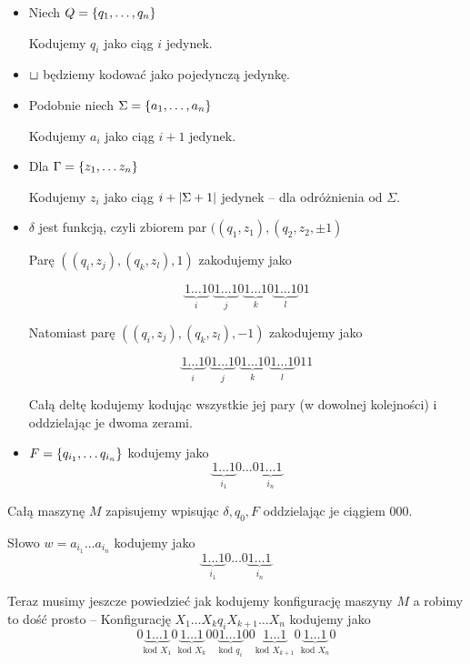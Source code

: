 \begin{itemize}
    \item Niech \( Q = \set{q_1, \dots, q_n} \)
    
    Kodujemy \( q_i \) jako ciąg \( i \) jedynek.
    
    \item \( \sqcup \) będziemy kodować jako pojedynczą jedynkę.
    
    
    \item Podobnie niech \( \Sigma = \set{a_1, \dots, a_n} \)
    
    Kodujemy \( a_i \) jako ciąg \( i + 1 \) jedynek.
    
    \item Dla \( \Gamma = \set{z_1, \dots z_n} \)
    
    Kodujemy \( z_i \) jako ciąg \( i + \card{\Sigma + 1} \) jedynek -- dla odróżnienia od \( \Sigma \).
    
    \item \( \delta \) jest funkcją, czyli zbiorem par \( ((q_1, z_1), (q_2, z_2, \pm 1) \)
    
    Parę \( ((q_i, z_j), (q_k, z_l), 1) \) zakodujemy jako
    
    \[
        \underbrace{1 \dots 1}_i
        0
        \underbrace{1 \dots 1}_j
        0
        \underbrace{1 \dots 1}_k
        0
        \underbrace{1 \dots 1}_l
        0
        1
    \]
    
    Natomiast parę \( ((q_i, z_j), (q_k, z_l), -1) \) zakodujemy jako
    
    \[
        \underbrace{1 \dots 1}_i
        0
        \underbrace{1 \dots 1}_j
        0
        \underbrace{1 \dots 1}_k
        0
        \underbrace{1 \dots 1}_l
        0
        11
    \]
    
    Całą deltę kodujemy kodując wszystkie jej pary (w dowolnej kolejności) i oddzielając je dwoma zerami.
    
    \item \( F = \set{q_{i_1}, \dots q_{i_n}} \) kodujemy jako
    \[
        \underbrace{1 \dots 1}_{i_1} 0 \dots 0 \underbrace{1 \dots 1}_{i_n}
    \]
\end{itemize}

Całą maszynę \( M \) zapisujemy wpisując \( \delta, q_0, F \) oddzielając je ciągiem \( 000 \).

Słowo \( w = a_{i_1} \dots a_{i_n} \) kodujemy jako
\[
    \underbrace{1 \dots 1}_{i_1} 0 \dots 0 \underbrace{1 \dots 1}_{i_n}
\]

Teraz musimy jeszcze powiedzieć jak kodujemy konfigurację maszyny \( M \) a robimy to dość prosto --
Konfigurację \( X_1 \dots X_k q_i X_{k+1} \dots X_n \) kodujemy jako
\[
    0\underbrace{1 \dots 1}_{\text{kod } X_1} 0 \underbrace{1 \dots 1}_{\text{kod } X_k} 00 \underbrace{1 \dots 1}_{\text{kod } q_i} 00 \underbrace{1 \dots 1}_{\text{kod } X_{k + 1}} 0 \underbrace{1 \dots 1}_{\text{kod } X_n} 0
\]

